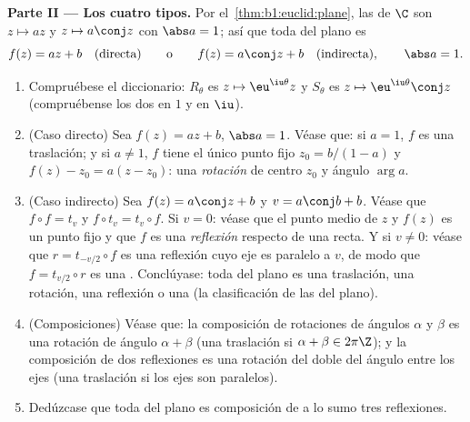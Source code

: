 \begin{problem}
\medskip
\noindent\textbf{Parte II --- Los cuatro tipos.} Por
el~\cref{thm:b1:euclid:plane}, las   de $\C$ son
$z \mapsto az$ y $z \mapsto a\conj z$ con $\abs a = 1$; así que toda
 del plano es
\[
f(z) = a z + b \quad (\text{directa}) \qquad\text{o}\qquad
f(z) = a\conj z + b \quad (\text{indirecta}), \qquad \abs a = 1 .
\]
\begin{enumerate}[resume]
  \item Compruébese el diccionario: $R_\theta$ es
        $z \mapsto \eu^{\iu\theta}z$ y $S_\theta$ es
        $z \mapsto \eu^{\iu\theta}\conj z$ (compruébense los dos en
        $1$ y en $\iu$).
  \item (Caso directo) Sea $f(z) = az + b$, $\abs a = 1$. Véase
        que: si $a = 1$, $f$ es una traslación; y si $a \neq 1$, $f$
        tiene el único punto fijo $z_0 = b/(1 - a)$ y
        $f(z) - z_0 = a(z - z_0)$: una \emph{rotación} de centro
        $z_0$ y ángulo $\arg a$.
  \item (Caso indirecto) Sea $f(z) = a\conj z + b$ y
        $v = a\conj b + b$. Véase que $f \circ f = t_v$ y
        $f \circ t_v = t_v \circ f$. Si $v = 0$: véase que el punto
        medio de $z$ y $f(z)$ es un punto fijo y que $f$ es una
        \emph{reflexión} respecto de una recta. Y si $v \neq 0$:
        véase que $r = t_{-v/2}\circ f$ es una reflexión cuyo eje es
        paralelo a $v$, de modo que $f = t_{v/2} \circ r$ es una
        \emph{}. Conclúyase: toda  del
        plano es una traslación, una rotación, una reflexión o una
         (la clasificación de las 
        del plano).
  \item (Composiciones) Véase que: la composición de rotaciones de
        ángulos $\alpha$ y $\beta$ es una rotación de ángulo
        $\alpha + \beta$ (una traslación si
        $\alpha + \beta \in 2\pi\Z$); y la composición de dos
        reflexiones es una rotación del doble del ángulo entre los
        ejes (una traslación si los ejes son paralelos).
  \item Dedúzcase que toda  del plano es composición de a
        lo sumo tres reflexiones.
\end{enumerate}


\end{problem}

